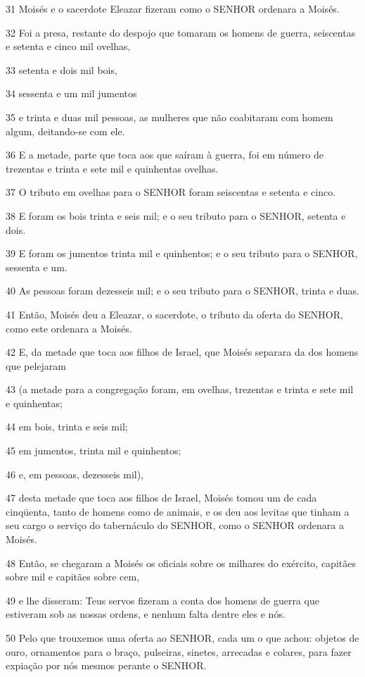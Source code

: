 \par 31 Moisés e o sacerdote Eleazar fizeram como o SENHOR ordenara a Moisés.
\par 32 Foi a presa, restante do despojo que tomaram os homens de guerra, seiscentas e setenta e cinco mil ovelhas,
\par 33 setenta e dois mil bois,
\par 34 sessenta e um mil jumentos
\par 35 e trinta e duas mil pessoas, as mulheres que não coabitaram com homem algum, deitando-se com ele.
\par 36 E a metade, parte que toca aos que saíram à guerra, foi em número de trezentas e trinta e sete mil e quinhentas ovelhas.
\par 37 O tributo em ovelhas para o SENHOR foram seiscentas e setenta e cinco.
\par 38 E foram os bois trinta e seis mil; e o seu tributo para o SENHOR, setenta e dois.
\par 39 E foram os jumentos trinta mil e quinhentos; e o seu tributo para o SENHOR, sessenta e um.
\par 40 As pessoas foram dezesseis mil; e o seu tributo para o SENHOR, trinta e duas.
\par 41 Então, Moisés deu a Eleazar, o sacerdote, o tributo da oferta do SENHOR, como este ordenara a Moisés.
\par 42 E, da metade que toca aos filhos de Israel, que Moisés separara da dos homens que pelejaram
\par 43 (a metade para a congregação foram, em ovelhas, trezentas e trinta e sete mil e quinhentas;
\par 44 em bois, trinta e seis mil;
\par 45 em jumentos, trinta mil e quinhentos;
\par 46 e, em pessoas, dezesseis mil),
\par 47 desta metade que toca aos filhos de Israel, Moisés tomou um de cada cinqüenta, tanto de homens como de animais, e os deu aos levitas que tinham a seu cargo o serviço do tabernáculo do SENHOR, como o SENHOR ordenara a Moisés.
\par 48 Então, se chegaram a Moisés os oficiais sobre os milhares do exército, capitães sobre mil e capitães sobre cem,
\par 49 e lhe disseram: Teus servos fizeram a conta dos homens de guerra que estiveram sob as nossas ordens, e nenhum falta dentre eles e nós.
\par 50 Pelo que trouxemos uma oferta ao SENHOR, cada um o que achou: objetos de ouro, ornamentos para o braço, pulseiras, sinetes, arrecadas e colares, para fazer expiação por nós mesmos perante o SENHOR.
